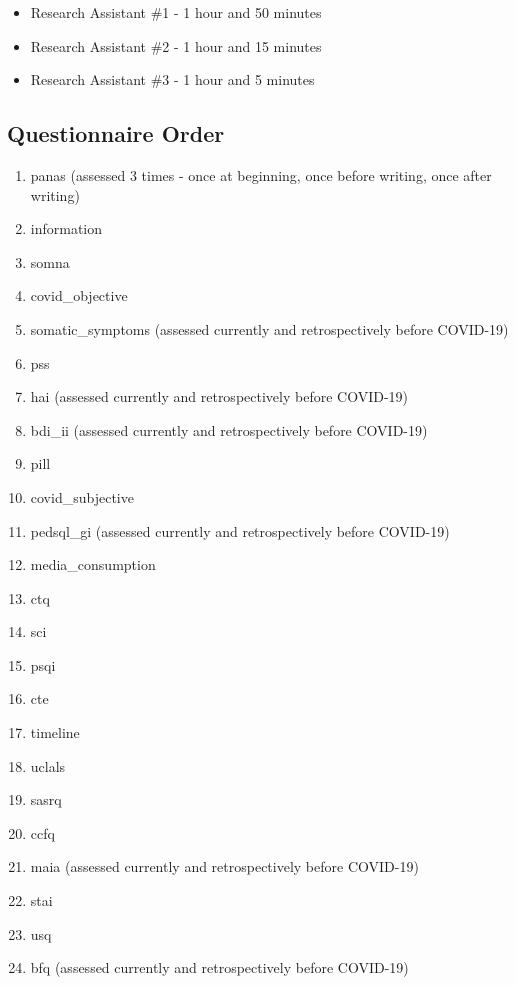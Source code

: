 \documentclass[]{book}
\providecommand{\tightlist}{%
  \setlength{\itemsep}{0pt}\setlength{\parskip}{0pt}}
\begin{document}
\begin{itemize}
\tightlist
\item
  Research Assistant \#1 - 1 hour and 50 minutes
\item
  Research Assistant \#2 - 1 hour and 15 minutes
\item
  Research Assistant \#3 - 1 hour and 5 minutes
\end{itemize}

\hypertarget{questionnaire-order}{%
\subsection{Questionnaire Order}\label{questionnaire-order}}

\begin{enumerate}
\def\labelenumi{\arabic{enumi}.}
\tightlist
\item
  panas (assessed 3 times - once at beginning, once before writing, once after writing)
\item
  information
\item
  somna
\item
  covid\_objective
\item
  somatic\_symptoms (assessed currently and retrospectively before COVID-19)
\item
  pss
\item
  hai (assessed currently and retrospectively before COVID-19)
\item
  bdi\_ii (assessed currently and retrospectively before COVID-19)
\item
  pill
\item
  covid\_subjective
\item
  pedsql\_gi (assessed currently and retrospectively before COVID-19)
\item
  media\_consumption
\item
  ctq
\item
  sci
\item
  psqi
\item
  cte
\item
  timeline
\item
  uclals
\item
  sasrq
\item
  ccfq
\item
  maia (assessed currently and retrospectively before COVID-19)
\item
  stai
\item
  usq
\item
  bfq (assessed currently and retrospectively before COVID-19)

\end{enumerate}
\end{document}
